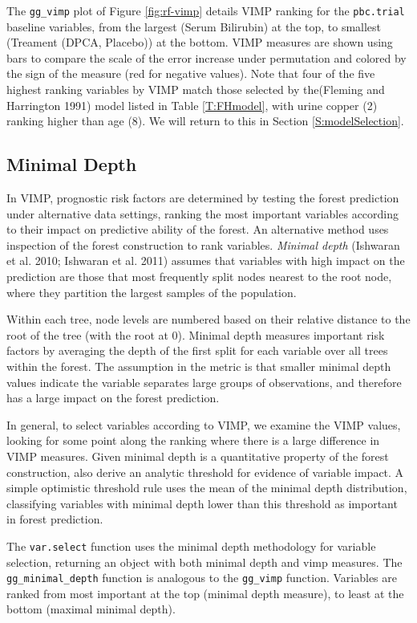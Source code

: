 \documentclass[article, nojss]{jss}
\begin{document}
The \texttt{gg\_vimp} plot of Figure \ref{fig:rf-vimp} details VIMP
ranking for the \texttt{pbc.trial} baseline variables, from the largest
(Serum Bilirubin) at the top, to smallest (Treament (DPCA, Placebo)) at
the bottom. VIMP measures are shown using bars to compare the scale of
the error increase under permutation and colored by the sign of the
measure (red for negative values). Note that four of the five highest
ranking variables by VIMP match those selected by the(Fleming and
Harrington 1991) model listed in Table \ref{T:FHmodel}, with urine
copper (2) ranking higher than age (8). We will return to this in
Section \ref{S:modelSelection}.

\subsection{Minimal Depth}\label{minimal-depth}

In VIMP, prognostic risk factors are determined by testing the forest
prediction under alternative data settings, ranking the most important
variables according to their impact on predictive ability of the forest.
An alternative method uses inspection of the forest construction to rank
variables. \emph{Minimal depth} (Ishwaran et al. 2010; Ishwaran et al.
2011) assumes that variables with high impact on the prediction are
those that most frequently split nodes nearest to the root node, where
they partition the largest samples of the population.

Within each tree, node levels are numbered based on their relative
distance to the root of the tree (with the root at 0). Minimal depth
measures important risk factors by averaging the depth of the first
split for each variable over all trees within the forest. The assumption
in the metric is that smaller minimal depth values indicate the variable
separates large groups of observations, and therefore has a large impact
on the forest prediction.

In general, to select variables according to VIMP, we examine the VIMP
values, looking for some point along the ranking where there is a large
difference in VIMP measures. Given minimal depth is a quantitative
property of the forest construction, \cite{Ishwaran:2010} also derive an
analytic threshold for evidence of variable impact. A simple optimistic
threshold rule uses the mean of the minimal depth distribution,
classifying variables with minimal depth lower than this threshold as
important in forest prediction.

The  \texttt{var.select} function uses the minimal
depth methodology for variable selection, returning an object with both
minimal depth and vimp measures. The 
\texttt{gg\_minimal\_depth} function is analogous to the
\texttt{gg\_vimp} function. Variables are ranked from most important at
the top (minimal depth measure), to least at the bottom (maximal minimal
depth).
\end{document}
